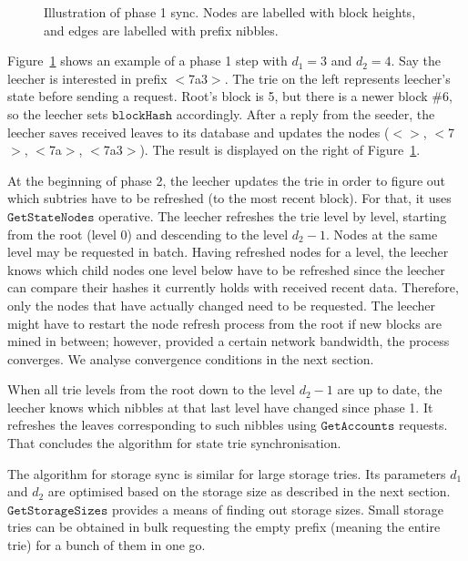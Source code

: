 \documentclass{amsart}
\begin{document}
\begin{figure}[h]
\caption{Illustration of phase 1 sync. Nodes are labelled with block heights, and edges are labelled with prefix nibbles.}
\label{fig:phase1_example}
\end{figure}

Figure~\ref{fig:phase1_example} shows an example of a phase 1 step with $d_1 = 3$ and $d_2 = 4$.
Say the leecher is interested in prefix $<$7a3$>$.
The trie on the left represents leecher's state before sending a request.
Root's block is 5,
but there is a newer block \#6,
so the leecher sets $\texttt{blockHash}$ accordingly.
After a reply from the seeder,
the leecher saves received leaves to its database and updates the nodes  ($<>$, $<$7$>$, $<$7a$>$, $<$7a3$>$).
The result is displayed on the right of Figure~\ref{fig:phase1_example}.

At the beginning of phase 2, the leecher updates the trie in order to figure out which subtries have to be refreshed
(to the most recent block).
For that, it uses $\texttt{GetStateNodes}$ operative.
The leecher refreshes the trie level by level, starting from the root (level 0) and descending to the level $d_2 - 1$.
Nodes at the same level may be requested in batch.
Having refreshed nodes for a level,
the leecher knows which child nodes one level below have to be refreshed since the leecher can compare their hashes it currently holds with received recent data.
Therefore, only the nodes that have actually changed need to be requested.
The leecher might have to restart the node refresh process from the root if new blocks are mined in between;
however, provided a certain network bandwidth, the process converges.
We analyse convergence conditions in the next section.

When all trie levels from the root down to the level $d_2 - 1$ are up to date,
the leecher knows which nibbles at that last level have changed since phase 1.
It refreshes the leaves corresponding to such nibbles using $\texttt{GetAccounts}$ requests. 
That concludes the algorithm for state trie synchronisation.

The algorithm for storage sync is similar for large storage tries.
Its parameters $d_1$ and $d_2$ are optimised based on the storage size as described in the next section.
$\texttt{GetStorageSizes}$ provides a means of finding out storage sizes.
Small storage tries can be obtained in bulk requesting the empty prefix (meaning the entire trie) for a bunch of them in one go.
\end{document}
